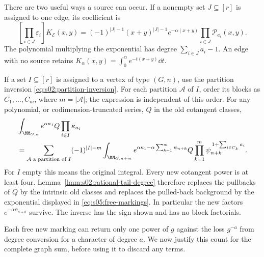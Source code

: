 There are two useful ways a source can occur. If a nonempty set
$J\subseteq[r]$ is assigned to one edge, its coefficient is
\begin{equation}\label{eq:s05:tagged-edge}
 [\textstyle\prod_{i\in J}\varepsilon_i]K_{\mathcal E}(x,y)
 =(-1)^{|J|-1}(x+y)^{|J|-1}e^{-\alpha(x+y)}
       \prod_{i\in J}\mathcal P_{a_i}(x,y).
\end{equation}
The polynomial multiplying the exponential has degree
$\sum_{i\in J}a_i-1$. An edge with no source retains
$K_\alpha(x,y)=\int_0^\alpha e^{-t(x+y)}\dd t$.

If a set $I\subseteq[r]$ is assigned to a vertex of type $(G,n)$,
use the partition inversion \eqref{eq:s02:partition-inversion}.
For each partition $\mathcal A$ of $I$, order its blocks as
$C_1,\ldots,C_m$, where $m=|\mathcal A|$; the expression is
independent of this order. For any polynomial, or
codimension-truncated series, $Q$ in the old cotangent classes,
\begin{align}
 &\int_{\MM_{G,n}}e^{\alpha\kappa_1}Q
                   \prod_{i\in I}\kappa_{a_i}\notag\\
 &=\sum_{\mathcal A\text{ a partition of }I}(-1)^{|I|-m}
   \int_{\MM_{G,n+m}}
    e^{\alpha\kappa_1-\alpha\sum_{k=1}^m\psi_{n+k}}
    Q
    \prod_{k=1}^m\psi_{n+k}^{\,1+\sum_{i\in C_k}a_i}.
 \label{eq:s05:free-markings}
\end{align}
For $I$ empty this means the original integral. Every new cotangent
power is at least four. Lemma~\ref{lmm:s02:rational-tail-degree}
therefore replaces the pullbacks of $Q$ by the intrinsic old classes
and replaces the pulled-back background by the exponential displayed
in \eqref{eq:s05:free-markings}. In particular the new factors
$e^{-\alpha\psi_{n+k}}$ survive. The inverse has the sign shown and
has no block factorials.

Each free new marking can return only one power of $g$ against the
loss $g^{-a}$ from degree conversion for a character of degree $a$.
We now justify this count for the complete graph sum, before using
it to discard any terms.

